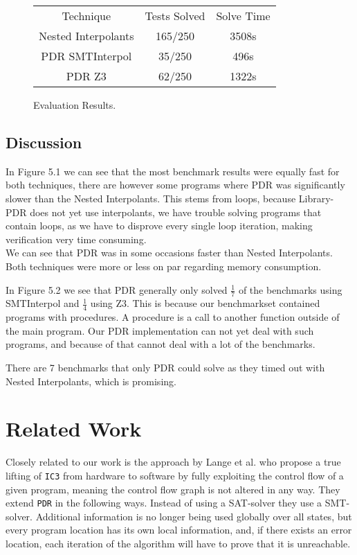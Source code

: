 \documentclass[11pt, a4paper, BCOR=10mm, ngerman]{scrbook}
\begin{document}
\vspace{2cm}

\begin{figure}[H]
\begin{center}
	\begin{tabu}{ccc}
		\cmidrule(lr){2-3}
		Technique & Tests Solved & Solve Time\\
		Nested Interpolants & 165/250 & 3508s \\
		PDR SMTInterpol& 35/250  & 496s \\
		PDR Z3 & 62/250& 1322s\\
		\bottomrule
	\end{tabu}
\end{center}
\caption{Evaluation Results.}
\end{figure}

\section{Discussion}
In Figure 5.1 we can see that the most benchmark results were equally fast for both techniques, there are however some programs where PDR was significantly slower than the Nested Interpolants. This stems from loops, because Library-PDR does not yet use interpolants, we have trouble solving programs that contain loops, as we have to disprove every single loop iteration, making verification very time consuming. \\
We can see that PDR was in some occasions faster than Nested Interpolants.
Both techniques were more or less on par regarding memory consumption. \par
In Figure 5.2 we see that PDR generally only solved $\frac{1}{7}$ of the benchmarks using SMTInterpol and $\frac{1}{4}$ using Z3. This is because our benchmarkset contained programs with procedures. A procedure is a call to another function outside of the main program. Our PDR implementation can not yet deal with such programs, and because of that cannot deal with a lot of the benchmarks. \par
There are 7 benchmarks that only PDR could solve as they timed out with Nested Interpolants, which is promising.
\pagebreak


\chapter{Related Work}

Closely related to our work is the approach by Lange et al. \cite{DBLP:conf/fmcad/0001NN15} who propose a true lifting of \texttt{IC3} from hardware to software by fully exploiting the control flow of a given program, meaning the control flow graph is not altered in any way. They extend \texttt{PDR} in the following ways. Instead of using a SAT-solver they use a SMT-solver. Additional information is no longer being used globally over all states, but every program location has its own local information, and, if there exists an error location, each iteration of the algorithm will have to prove that it is unreachable. \par
\end{document}
